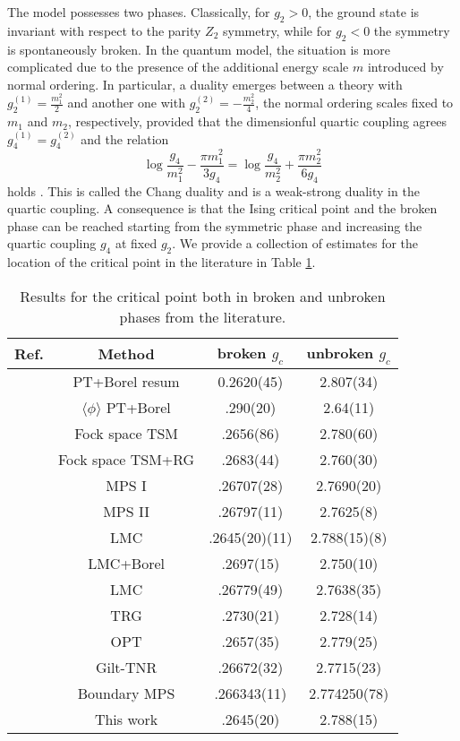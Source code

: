 \documentclass[twocolumn,secnumarabic,amssymb, nobibnotes, aps, prd]{revtex4-2}
\newcommand{\be}{\begin{equation}}
\newcommand{\ee}{\end{equation}}
\begin{document}
The model possesses two phases. Classically, for $g_2>0$, the ground state is invariant
with respect to the parity $Z_2$ symmetry, while for $g_2<0$ the symmetry is
spontaneously broken.
In the quantum model, the situation is more complicated due to the presence of the additional energy scale $m$ introduced by normal ordering.
In particular, a duality emerges between a theory with $g_2^{(1)} = \frac{m_1^2}{2}$ and another one with $g_2^{(2)}=-\frac{m_2^2}{4}$, the normal ordering scales fixed to $m_1$ and $m_2$, respectively, provided that the dimensionful quartic coupling agrees $g_4^{(1)}=g_4^{(2)}$ and the relation
\be
\log \frac{g_4}{m_1^2}-\frac{\pi m_1^2}{3 g_4}=\log \frac{g_4}{m_2^2}+\frac{\pi m_2^2}{6 g_4}
\ee
holds \cite{Rychkov:2015vap}. This is called the Chang duality and is a weak-strong duality in the quartic coupling. A consequence is that the Ising critical point and the broken phase can be reached starting from the symmetric phase and increasing the quartic coupling $g_4$ at fixed $g_2$. We provide a collection of estimates for the location of the critical point in the literature in Table \ref{tab:CritRefTab}. 

\begin{table}[]
\centering
\begin{tabular}{|c|c|c|c|}
\hline
Ref. &  Method & broken $g_c$  & unbroken $g_c$\\     \hline
\cite{Serone:2018gjo}  & PT+Borel resum & 0.2620(45)  & 2.807(34)          \\
\cite{Serone:2019szm} & $\langle\phi\rangle$ PT+Borel & .290(20) & 2.64(11) \\ 
\cite{Bajnok:2015bgw}  & Fock space TSM & .2656(86) & 2.780(60)          \\
\cite{Elias-Miro:2017tup}  & Fock space TSM+RG& .2683(44) & 2.760(30)          \\
\cite{Milsted:2013rxa}  & MPS I & .26707(28) & 2.7690(20)          \\
\cite{Milsted:2013rxa}  & MPS II & .26797(11) & 2.7625(8)          \\
\cite{Bosetti:2015lsa} & LMC & .2645(20)(11) & 2.788(15)(8) \\
\cite{Pelissetto:2015yha} & LMC+Borel & .2697(15) & 2.750(10) \\
\cite{Bronzin:2018tqz} & LMC & .26779(49)& 2.7638(35) \\
\cite{Kadoh:2018tis} & TRG & .2730(21) & 2.728(14) \\
\cite{Heymans:2021rqo} & OPT & .2657(35) & 2.779(25) \\
\cite{Delcamp:2020hzo} & Gilt-TNR &.26672(32) & 2.7715(23) \\
\cite{Vanhecke:2021noi} & Boundary MPS & .266343(11)&  2.774250(78)\\
& This work & .2645(20) & 2.788(15) \\
\hline
\end{tabular}

\caption{Results for the critical point both in broken and unbroken phases from the literature.}
\label{tab:CritRefTab}
\end{table}
\end{document}

